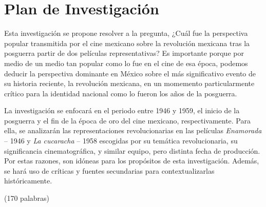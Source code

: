 \section{Plan de Investigación}
Esta investigación se propone resolver a la pregunta,
¿Cuál fue la perspectiva popular transmitida por el cine mexicano sobre la revolución mexicana tras la posguerra partir de dos películas representativas? Es importante porque por medio de un medio tan popular como lo fue en el cine de esa época, podemos deducir la perspectiva dominante en México sobre el más significativo evento de su historia reciente, la revolución mexicana, en un momemento particularmente crítico para la identidad nacional como lo fueron los años de la posguerra.

La investigación se enfocará en el periodo entre 1946 y 1959, el inicio de la posguerra y el fin de la época de oro del cine mexicano, respectivamente. Para ella, se analizarán las representaciones revolucionarias en las películas \textit{Enamorada} -- 1946 y \textit{La cucaracha} -- 1958 escogidas por su temática revolucionaria, su significancia cinematográfica, y similar equipo, pero distinta fecha de producción. Por estas razones, son idóneas para los propósitos de esta investigación. Además, se hará uso de críticas y fuentes secundarias para contextualizarlas históricamente.

(170 palabras)
\pagebreak
